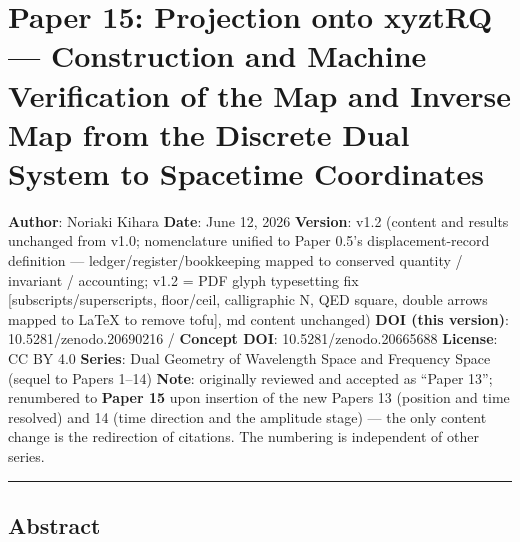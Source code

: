 \documentclass[
]{ltjsarticle}
\author{}
\date{}
\begin{document}
\section{Paper 15: Projection onto xyztRQ --- Construction and Machine
Verification of the Map and Inverse Map from the Discrete Dual System to
Spacetime
Coordinates}\label{paper-15-projection-onto-xyztrq-construction-and-machine-verification-of-the-map-and-inverse-map-from-the-discrete-dual-system-to-spacetime-coordinates}

\textbf{Author}: Noriaki Kihara \textbf{Date}: June 12, 2026
\textbf{Version}: v1.2 (content and results unchanged from v1.0;
nomenclature unified to Paper 0.5's displacement-record definition ---
ledger/register/bookkeeping mapped to conserved quantity / invariant /
accounting; v1.2 = PDF glyph typesetting fix {[}subscripts/superscripts,
floor/ceil, calligraphic N, QED square, double arrows mapped to LaTeX to
remove tofu{]}, md content unchanged) \textbf{DOI (this version)}:
10.5281/zenodo.20690216 / \textbf{Concept DOI}: 10.5281/zenodo.20665688
\textbf{License}: CC BY 4.0 \textbf{Series}: Dual Geometry of Wavelength
Space and Frequency Space (sequel to Papers 1--14) \textbf{Note}:
originally reviewed and accepted as ``Paper 13''; renumbered to
\textbf{Paper 15} upon insertion of the new Papers 13 (position and time
resolved) and 14 (time direction and the amplitude stage) --- the only
content change is the redirection of citations. The numbering is
independent of other series.

\begin{center}\rule{0.5\linewidth}{0.5pt}\end{center}

\subsection{Abstract}\label{abstract}
\end{document}
